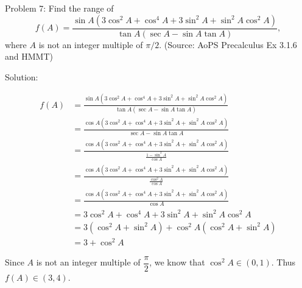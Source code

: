 Problem 7: Find the range of \[f(A) = \frac{\sin A (3 \cos^2 A + \cos^4 A + 3 \sin^2 A + \sin^2 A \cos^2 A)}{\tan A (\sec A - \sin A \tan A)},\]where $A$ is not an integer multiple of $\pi/2$. (Source: AoPS Precalculus Ex 3.1.6 and HMMT)

Solution:

\begin{align*}
f(A) &= \frac{\sin A (3 \cos^2 A + \cos^4 A + 3 \sin^2 A + \sin^2 A \cos^2 A)}{\tan A (\sec A - \sin A \tan A)} \\
&= \frac{\cos A (3 \cos^2 A + \cos^4 A + 3 \sin^2 A + \sin^2 A \cos^2 A)}{\sec A - \sin A \tan A} \\
&= \frac{\cos A (3 \cos^2 A + \cos^4 A + 3 \sin^2 A + \sin^2 A \cos^2 A)}{\frac{1 - \sin^2 A}{\cos A}} \\
&= \frac{\cos A (3 \cos^2 A + \cos^4 A + 3 \sin^2 A + \sin^2 A \cos^2 A)}{\frac{\cos^2 A}{\cos A}} \\
&= \frac{\cos A (3 \cos^2 A + \cos^4 A + 3 \sin^2 A + \sin^2 A \cos^2 A)}{\cos A} \\
&= 3 \cos^2 A + \cos^4 A + 3 \sin^2 A + \sin^2 A \cos^2 A \\
&= 3 (\cos^2 A + \sin^2 A) + \cos^2 A(\cos^2 A + \sin^2 A) \\
&= 3 + \cos^2 A
\end{align*}

Since $A$ is not an integer multiple of $\dfrac{\pi}{2}$, we know that $\cos^2 A \in (0, 1)$. Thus $\boxed{f(A) \in (3, 4)}$.
